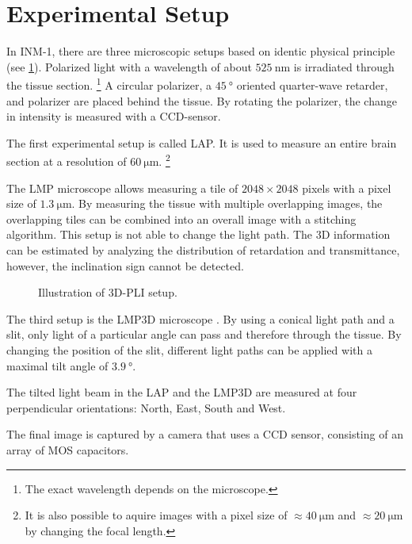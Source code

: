 \section{Experimental Setup}\label{sec:expSetup}
%
In \ac{INM-1}, there are three microscopic setups based on identic physical principle \cite{Axer2011} (see \cref{fig:pli_setup}).
Polarized light with a wavelength of about $\SI{525}{\nano\meter}$ is irradiated through the tissue section. \footnote{The exact wavelength depends on the microscope.}
A circular polarizer, a $\SI{45}{\degree}$ oriented quarter-wave retarder, and polarizer are placed behind the tissue.
By rotating the polarizer, the change in intensity is measured with a \ac{CCD}-sensor.
\par
% 
The first experimental setup is called \ac{LAP}.
It is used to measure an entire brain section at a resolution of $\SI{60}{\micro\meter}$. \footnote{It is also possible to aquire images with a pixel size of $\approx \SI{40}{\micro\meter}$ and $\approx \SI{20}{\micro\meter}$ by changing the focal length.}
\par
% 
The \ac{LMP} microscope allows measuring a tile of $\num{2048}\times\num{2048}$ pixels with a pixel size of $\SI{1.3}{\micro\meter}$.
By measuring the tissue with multiple overlapping images, the overlapping tiles can be combined into an overall image with a stitching algorithm. 
This setup is not able to change the light path.
The 3D information can be estimated by analyzing the distribution of retardation and transmittance, however, the inclination sign cannot be detected.
\par
% 
\begin{figure}[!t]
    \captionsetup[sub]{position=top}
    \setlength{\tikzwidth}{\textwidth}
	\centering
	\caption{Illustration of \acs{3D-PLI} setup.}
	\label{fig:pli_setup}
\end{figure}
% 
The third setup is the \ac{LMP3D} microscope \cite{Wiese:887678}.
By using a conical light path and a slit, only light of a particular angle can pass and therefore through the tissue.
By changing the position of the slit, different light paths can be applied with a maximal tilt angle of $\SI{3.9}{\degree}$.
\par
% 
The tilted light beam in the \acs{LAP} and the \acs{LMP3D} are measured at four perpendicular orientations: North, East, South and West.
\par
%
The final image is captured by a camera that uses a \ac{CCD} sensor, consisting of an array of \ac{MOS} capacitors.
